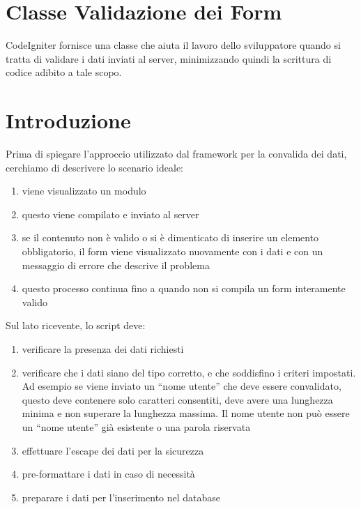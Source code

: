 \section{Classe Validazione dei Form}
\label{class:formvalidation}

CodeIgniter fornisce una classe che aiuta il lavoro dello sviluppatore quando si tratta di validare i dati inviati al server, minimizzando quindi la scrittura di codice adibito a tale scopo.

\section*{Introduzione}
Prima di spiegare l'approccio utilizzato dal framework per la convalida dei dati, cerchiamo di descrivere lo scenario ideale:

\begin{enumerate}
\item viene visualizzato un modulo
\item questo viene compilato e inviato al server
\item se il contenuto non è valido o si è dimenticato di inserire un elemento obbligatorio, il form viene visualizzato nuovamente con i dati e con un messaggio di errore che descrive il problema
\item questo processo continua fino a quando non si compila un form interamente valido
\end{enumerate}

Sul lato ricevente, lo script deve:

\begin{enumerate}
\item verificare la presenza dei dati richiesti
\item verificare che i dati siano del tipo corretto, e che soddisfino i criteri impostati. Ad esempio se viene inviato un ``nome utente'' che deve essere convalidato, questo deve contenere solo caratteri consentiti, deve avere una lunghezza minima e non superare la lunghezza massima. Il nome utente non può essere un ``nome utente'' già esistente o una parola riservata
\item effettuare l'escape dei dati per la sicurezza
\item pre-formattare i dati in caso di necessità
\item preparare i dati per l'inserimento nel database
\end{enumerate}

